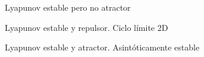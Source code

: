 \begin{figure}[ht]
    \centering
    \caption{Lyapunov estable pero no atractor}
    \label{fig:cp5}
\end{figure}

\begin{figure}[ht]
    \centering        
    \caption{Lyapunov estable y repulsor. Ciclo límite 2D}
    \label{fig:cp6}
\end{figure}

\begin{figure}[ht]
    \centering
    \caption{Lyapunov estable y atractor. Asintóticamente estable}
    \label{fig:cp7}
\end{figure}  
